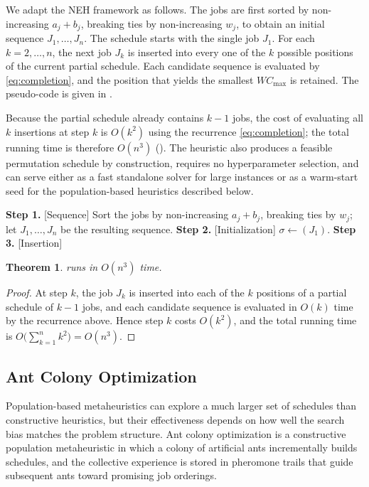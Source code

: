 \documentclass[12pt]{article}
\newtheorem{theorem}{Theorem}[section]
\let\origsubsection\subsection
\renewcommand{\subsection}{\FloatBarrier\origsubsection}
\begin{document}
\begin{sloppypar}
We adapt the NEH framework as follows. The jobs are first sorted by non-increasing
$a_j+b_j$, breaking ties by non-increasing $w_j$, to obtain an initial sequence
$J_1,\dots,J_n$. The schedule starts with the single job $J_1$. For each $k=2,\dots,n$, the
next job $J_k$ is inserted into every one of the $k$ possible positions of the current
partial schedule. Each candidate sequence is evaluated by \cref{eq:completion}, and the
position that yields the smallest $W C_{\max}$ is retained. The pseudo-code is given in
.

Because the partial schedule already contains $k-1$ jobs, the cost of evaluating all $k$
insertions at step $k$ is $O(k^2)$ using the recurrence \cref{eq:completion}; the total
running time is therefore $O(n^3)$ (). The heuristic also
produces a feasible permutation schedule by construction, requires no hyperparameter
selection, and can serve either as a fast standalone solver for large instances or as a
warm-start seed for the population-based heuristics described below.

\begin{algorithm}[tbp]
\small
\linespread{1.2}\selectfont
\SetAlgoLined
\DontPrintSemicolon
\caption{NEH heuristic for $F2 \parallel W C_{\max}$}\label{alg:neh}
\BlankLine
\textbf{Step 1.} [Sequence] Sort the jobs by non-increasing $a_j+b_j$, breaking ties by $w_j$; 
let $J_{1},\dots,J_{n}$ be the resulting sequence. \;
\textbf{Step 2.} [Initialization] $\sigma\gets(J_{1})$. \;
\textbf{Step 3.} [Insertion] 
\end{algorithm}

\begin{theorem}\label{prop:neh-complexity}
 runs in $O(n^3)$ time.
\end{theorem}
\begin{proof}
At step $k$, the job $J_{k}$ is inserted into each of the $k$ positions of a partial
schedule of $k-1$ jobs, and each candidate sequence is evaluated in $O(k)$ time by the
recurrence above. Hence step $k$ costs $O(k^2)$, and the total running time is
$O\bigl(\sum_{k=1}^{n}k^2\bigr)=O(n^3)$.
\end{proof}






\subsection{Ant Colony Optimization}
Population-based metaheuristics can explore a much larger set of schedules than constructive
heuristics, but their effectiveness depends on how well the search bias matches the problem
structure. Ant colony optimization \citep{zhang2023} is a constructive population
metaheuristic in which a colony of artificial ants incrementally builds schedules, and the
collective experience is stored in pheromone trails that guide subsequent ants toward
promising job orderings.


\end{sloppypar}
\end{document}
